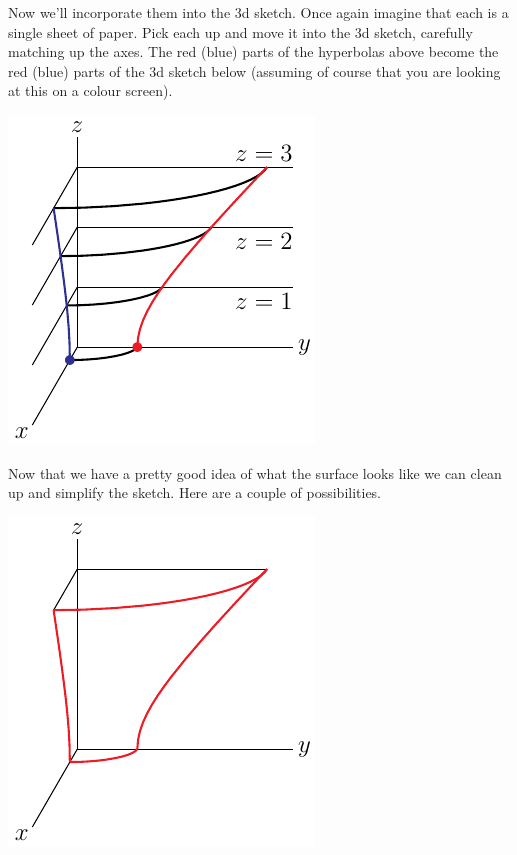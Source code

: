 \begin{eg}[$4x^2+y^2-z^2=1$]
\begin{efig}
\begin{center}
\end{center}
\end{efig}
Now we'll incorporate them into the 3d sketch. Once again imagine that each
is a single sheet of paper. Pick each up and move it into the 3d sketch,
carefully matching up the axes. The red (blue) parts of the hyperbolas
above become the red (blue) parts of the 3d sketch below (assuming of course
that you are looking at this on a colour screen).  
\begin{efig}
\begin{center}
   \includegraphics{hyperboloidBa.pdf}
\end{center}
\end{efig}
Now that we have a pretty good idea of what the surface looks like
we can clean up and simplify the sketch. Here are a couple of 
possibilities.
\begin{efig}
\begin{center}
   \includegraphics{hyperboloidC.pdf}\qquad\qquad

\end{center}
\end{efig}
\end{eg}
